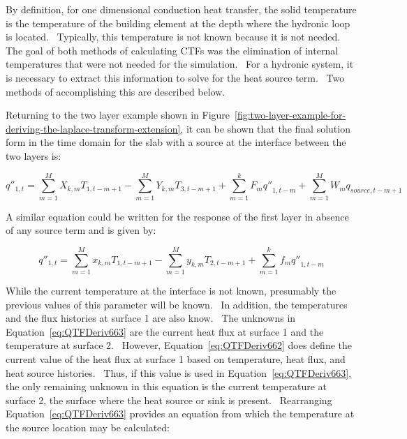 By definition, for one dimensional conduction heat transfer, the solid temperature is the temperature of the building element at the depth where the hydronic loop is located.~ Typically, this temperature is not known because it is not needed.~ The goal of both methods of calculating CTFs was the elimination of internal temperatures that were not needed for the simulation.~ For a hydronic system, it is necessary to extract this information to solve for the heat source term.~ Two methods of accomplishing this are described below.

Returning to the two layer example shown in Figure~\ref{fig:two-layer-example-for-deriving-the-laplace-transform-extension}, it can be shown that the final solution form in the time domain for the slab with a source at the interface between the two layers is:

\begin{equation}
{q''_{1,t}} = \sum\limits_{m = 1}^M {{X_{k,m}}{T_{1,t - m + 1}}}  - \sum\limits_{m = 1}^M {{Y_{k,m}}{T_{3,t - m + 1}}}  + \sum\limits_{m = 1}^k {{F_m}{{q''}_{1,t - m}}}  + \sum\limits_{m = 1}^M {{W_m}{q_{source,t - m + 1}}}
\label{eq:QTFDeriv662}
\end{equation}

A similar equation could be written for the response of the first layer in absence of any source term and is given by:

\begin{equation}
{q''_{1,t}} = \sum\limits_{m = 1}^M {{x_{k,m}}{T_{1,t - m + 1}}}  - \sum\limits_{m = 1}^M {{y_{k,m}}{T_{2,t - m + 1}}}  + \sum\limits_{m = 1}^k {{f_m}{{q''}_{1,t - m}}}
\label{eq:QTFDeriv663}
\end{equation}

While the current temperature at the interface is not known, presumably the previous values of this parameter will be known.~ In addition, the temperatures and the flux histories at surface 1 are also know.~ The unknowns in Equation~\ref{eq:QTFDeriv663} are the current heat flux at surface 1 and the temperature at surface 2.~ However, Equation~\ref{eq:QTFDeriv662} does define the current value of the heat flux at surface 1 based on temperature, heat flux, and heat source histories.~ Thus, if this value is used in Equation~\ref{eq:QTFDeriv663}, the only remaining unknown in this equation is the current temperature at surface 2, the surface where the heat source or sink is present.~ Rearranging Equation~\ref{eq:QTFDeriv663} provides an equation from which the temperature at the source location may be calculated:

